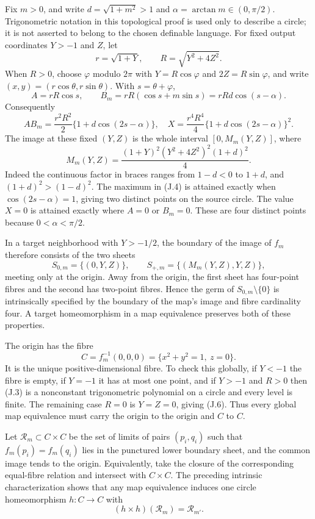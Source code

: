 Fix $m>0$, and write $d=\sqrt{1+m^2}>1$ and
$\alpha=\arctan m\in(0,\pi/2)$. Trigonometric notation in this
topological proof is used only to describe a circle; it is not asserted
to belong to the chosen definable language. For fixed output coordinates
$Y>-1$ and $Z$, let
\[
 r=\sqrt{1+Y},\qquad R=\sqrt{Y^2+4Z^2}.
\]
When $R>0$, choose $\varphi$ modulo $2\pi$ with
$Y=R\cos\varphi$ and $2Z=R\sin\varphi$, and write
$(x,y)=(r\cos\theta,r\sin\theta)$. With $s=\theta+\varphi$,
\[
 A=rR\cos s,\qquad
 B_m=rR(\cos s+m\sin s)=rRd\cos(s-\alpha).
\]
Consequently
\[
 A B_m=\frac{r^2R^2}{2}\{1+d\cos(2s-\alpha)\},
\quad
 X=\frac{r^4R^4}{4}\{1+d\cos(2s-\alpha)\}^2.
\tag{J.3}
\]
The image at these fixed $(Y,Z)$ is the whole interval $[0,M_m(Y,Z)]$,
where
\[
 M_m(Y,Z)=\frac{(1+Y)^2(Y^2+4Z^2)^2(1+d)^2}{4}.
\tag{J.4}
\]
Indeed the continuous factor in braces ranges from $1-d<0$ to
$1+d$, and $(1+d)^2>(1-d)^2$. The maximum in (J.4) is attained
exactly when $\cos(2s-\alpha)=1$, giving two distinct points on the
source circle. The value $X=0$ is attained exactly where $A=0$ or
$B_m=0$. These are four distinct points because
$0<\alpha<\pi/2$.

In a target neighborhood with $Y>-1/2$, the boundary of the image of
$f_m$ therefore consists of the two sheets
\[
 S_{0,m}=\{(0,Y,Z)\},\qquad
 S_{+,m}=\{(M_m(Y,Z),Y,Z)\},
\tag{J.5}
\]
meeting only at the origin. Away from the origin, the first sheet has
four-point fibres and the second has two-point fibres. Hence the germ
of $S_{0,m}\setminus\{0\}$ is intrinsically specified by the boundary
of the map's image and fibre cardinality four. A target homeomorphism
in a map equivalence preserves both of these properties.

The origin has the fibre
\[
 C=f_m^{-1}(0,0,0)=\{x^2+y^2=1,\ z=0\}.
\tag{J.6}
\]
It is the unique positive-dimensional fibre. To check this globally,
if $Y<-1$ the fibre is empty, if $Y=-1$ it has at most one point,
and if $Y>-1$ and $R>0$ then (J.3) is a nonconstant trigonometric
polynomial on a circle and every level is finite. The remaining case
$R=0$ is $Y=Z=0$, giving (J.6). Thus every global map equivalence
must carry the origin to the origin and $C$ to $C$.

Let $\mathcal R_m\subset C\times C$ be the set of limits of pairs
$(p_i,q_i)$ such that $f_m(p_i)=f_m(q_i)$ lies in the punctured lower
boundary sheet, and the common image tends to the origin. Equivalently,
take the closure of the corresponding equal-fibre relation and intersect
with $C\times C$. The preceding intrinsic characterization shows that
any map equivalence induces one circle homeomorphism $h:C\to C$ with
\[
 (h\times h)(\mathcal R_m)=\mathcal R_{m'}.
\tag{J.7}
\]

